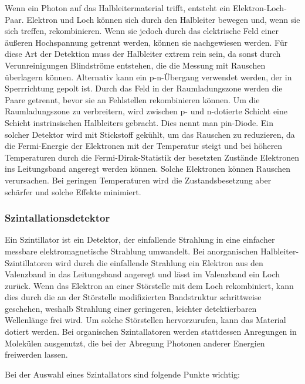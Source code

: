 \documentclass[
	a4paper,
	12pt,
	pagesize,
	ngerman
]{scrartcl}
\begin{document}
	Wenn ein Photon auf das Halbleitermaterial trifft, entsteht ein Elektron-Loch-Paar.
	Elektron und Loch können sich durch den Halbleiter bewegen und, wenn sie sich treffen, rekombinieren.
	Wenn sie jedoch durch das elektrische Feld einer äußeren Hochspannung getrennt werden, können sie nachgewiesen werden.
	Für diese Art der Detektion muss der Halbleiter extrem rein sein, da sonst durch Verunreinigungen Blindströme entstehen, die die Messung mit Rauschen überlagern können.
	Alternativ kann ein p-n-Übergang verwendet werden, der in Sperrrichtung gepolt ist.
	Durch das Feld in der Raumladungszone werden die Paare getrennt, bevor sie an Fehlstellen rekombinieren können.
	Um die Raumladungszone zu verbreitern, wird zwischen p- und n-dotierte Schicht eine Schicht instrinsischen Halbleiters gebracht.
	Dies nennt man pin-Diode.
	Ein solcher Detektor wird mit Stickstoff gekühlt, um das Rauschen zu reduzieren, da die Fermi-Energie der Elektronen mit der Temperatur steigt und bei höheren Temperaturen durch die Fermi-Dirak-Statistik der besetzten Zustände Elektronen ins Leitungsband angeregt werden können.
	Solche Elektronen können Rauschen verursachen.
	Bei geringen Temperaturen wird die Zustandsbesetzung aber schärfer und solche Effekte minimiert.

	\subsubsection{Szintallationsdetektor} %

	Ein Szintillator ist ein Detektor, der einfallende Strahlung in eine einfacher messbare elektromagnetische Strahlung umwandelt.
	Bei anorganischen Halbleiter-Szintillatoren wird durch die einfallende Strahlung ein Elektron aus den Valenzband in das Leitungsband angeregt und lässt im Valenzband ein Loch zurück.
	Wenn das Elektron an einer Störstelle mit dem Loch rekombiniert, kann dies durch die an der Störstelle modifizierten Bandstruktur schrittweise geschehen, weshalb Strahlung einer geringeren, leichter detektierbaren Wellenlänge frei wird.
	Um solche Störstellen hervorzurufen, kann das Material dotiert werden.
	Bei organischen Szintallatoren werden stattdessen Anregungen in Molekülen ausgenutzt, die bei der Abregung Photonen anderer Energien freiwerden lassen.

	Bei der Auswahl eines Szintallators sind folgende Punkte wichtig:
\end{document}
